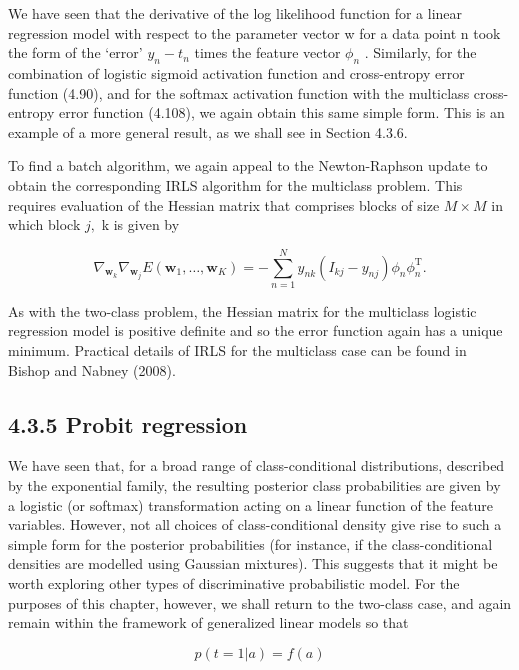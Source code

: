 \documentclass[
  10
]{article}
\begin{document}
We have seen that the derivative of the log likelihood function for a
linear regression model with respect to the parameter vector w for a
data point n took the form of the `error' \(y _ { n } - t _ { n }\)
times the feature vector \(\phi _ { n }\) . Similarly, for the
combination of logistic sigmoid activation function and cross-entropy
error function (4.90), and for the softmax activation function with the
multiclass cross-entropy error function (4.108), we again obtain this
same simple form. This is an example of a more general result, as we
shall see in Section 4.3.6.

To find a batch algorithm, we again appeal to the Newton-Raphson update
to obtain the corresponding IRLS algorithm for the multiclass problem.
This requires evaluation of the Hessian matrix that comprises blocks of
size \(M \times M\) in which block \(j ,\) k is given by

\[
\nabla_ {\mathbf {w} _ {k}} \nabla_ {\mathbf {w} _ {j}} E (\mathbf {w} _ {1}, \ldots , \mathbf {w} _ {K}) = - \sum_ {n = 1} ^ {N} y _ {n k} (I _ {k j} - y _ {n j}) \phi_ {n} \phi_ {n} ^ {\mathrm{T}}.\tag{4.110}
\]

As with the two-class problem, the Hessian matrix for the multiclass
logistic regression model is positive definite and so the error function
again has a unique minimum. Practical details of IRLS for the multiclass
case can be found in Bishop and Nabney (2008).

\subsection{4.3.5 Probit regression}\label{probit-regression}

We have seen that, for a broad range of class-conditional distributions,
described by the exponential family, the resulting posterior class
probabilities are given by a logistic (or softmax) transformation acting
on a linear function of the feature variables. However, not all choices
of class-conditional density give rise to such a simple form for the
posterior probabilities (for instance, if the class-conditional
densities are modelled using Gaussian mixtures). This suggests that it
might be worth exploring other types of discriminative probabilistic
model. For the purposes of this chapter, however, we shall return to the
two-class case, and again remain within the framework of generalized
linear models so that

\[
p (t = 1 | a) = f (a)\tag{4.111}
\]
\end{document}
